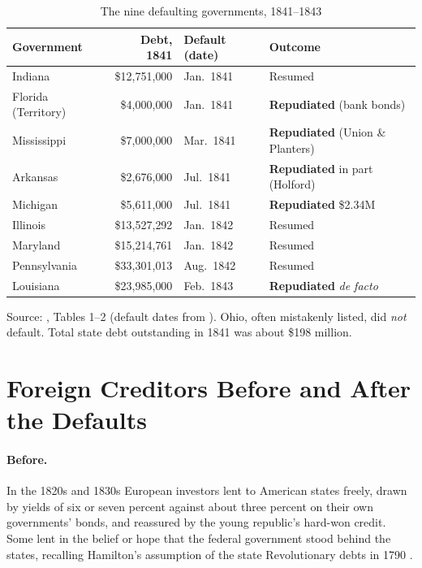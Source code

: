 \documentclass[12pt]{article}
\begin{document}
\begin{table}[htbp]
\centering
\caption{The nine defaulting governments, 1841--1843}
\label{tab:defaults}
\small
\begin{tabular}{l r l l}
\toprule
Government & Debt, 1841 & Default (date) & Outcome \\
\midrule
Indiana            & \$12{,}751{,}000 & Jan.\ 1841 & Resumed \\
Florida (Territory) & \$4{,}000{,}000  & Jan.\ 1841 & \textbf{Repudiated} (bank bonds) \\
Mississippi        & \$7{,}000{,}000  & Mar.\ 1841 & \textbf{Repudiated} (Union \& Planters) \\
Arkansas           & \$2{,}676{,}000  & Jul.\ 1841 & \textbf{Repudiated} in part (Holford) \\
Michigan           & \$5{,}611{,}000  & Jul.\ 1841 & \textbf{Repudiated} \$2.34M \\
Illinois           & \$13{,}527{,}292 & Jan.\ 1842 & Resumed \\
Maryland           & \$15{,}214{,}761 & Jan.\ 1842 & Resumed \\
Pennsylvania       & \$33{,}301{,}013 & Aug.\ 1842 & Resumed \\
Louisiana          & \$23{,}985{,}000 & Feb.\ 1843 & \textbf{Repudiated} \emph{de facto} \\
\bottomrule
\end{tabular}

\smallskip
\footnotesize Source: \citet{wallis2004sovereign}, Tables 1--2 (default dates from
\citealp{english1996understanding}). Ohio, often mistakenly listed, did \emph{not}
default. Total state debt outstanding in 1841 was about \$198 million.
\end{table}

\section{Foreign Creditors Before and After the Defaults}
\label{sec:creditors}

\paragraph{Before.} In the 1820s and 1830s European investors lent to American
states freely, drawn by yields of six or seven percent against about three percent
on their own governments' bonds, and reassured by the young republic's hard-won
credit. Some lent in the belief or hope that the federal government stood behind
the states, recalling Hamilton's assumption of the state Revolutionary debts in
1790 \citep{wallis2004sovereign, roberts2010ungovernable}.
\end{document}
